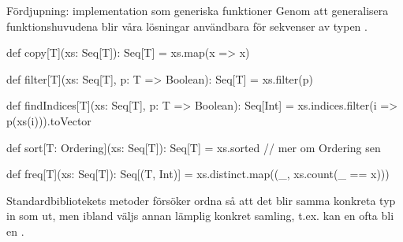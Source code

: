 \ifkompendium  
\begin{Slide}{Fördjupning: implementation som generiska funktioner}
Genom att generalisera funktionshuvudena blir våra lösningar användbara för  sekvenser av typen .
\begin{Code}
def copy[T](xs: Seq[T]): Seq[T] = xs.map(x => x)

def filter[T](xs: Seq[T], p: T => Boolean): Seq[T] = xs.filter(p)

def findIndices[T](xs: Seq[T], p: T => Boolean): Seq[Int] =
  xs.indices.filter(i => p(xs(i))).toVector

def sort[T: Ordering](xs: Seq[T]): Seq[T] = xs.sorted // mer om Ordering sen

def freq[T](xs: Seq[T]): Seq[(T, Int)] =
  xs.distinct.map((_, xs.count(_ == x)))
\end{Code}
\pause
Standardbibliotekets metoder försöker ordna så att det blir samma konkreta typ in som ut, men ibland väljs annan lämplig konkret samling, t.ex. kan en  ofta bli en .
\end{Slide}
\else 
\fi